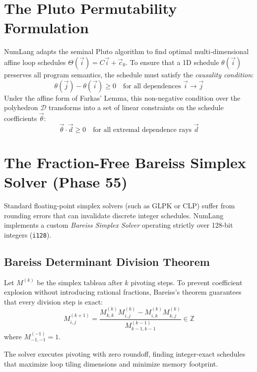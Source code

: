 \section{The Pluto Permutability Formulation}
\label{sec:polyhedral:pluto}

NumLang adapts the seminal Pluto algorithm \citep{bondhugula2008pluto} to find optimal multi-dimensional affine loop schedules $\Theta(\vec{i}) = C \vec{i} + \vec{c}_0$. To ensure that a 1D schedule $\theta(\vec{i})$ preserves all program semantics, the schedule must satisfy the \emph{causality condition}:
\begin{equation}
\theta(\vec{j}) - \theta(\vec{i}) \ge 0 \quad \text{for all dependences } \vec{i} \to \vec{j}
\end{equation}
Under the affine form of Farkas' Lemma, this non-negative condition over the polyhedron $\mathcal{D}$ transforms into a set of linear constraints on the schedule coefficients $\vec{\theta}$:
\begin{equation}
\vec{\theta} \cdot \vec{d} \ge 0 \quad \text{for all extremal dependence rays } \vec{d}
\end{equation}

\section{The Fraction-Free Bareiss Simplex Solver (Phase 55)}
\label{sec:polyhedral:bareiss_solver}

Standard floating-point simplex solvers (such as GLPK or CLP) suffer from rounding errors that can invalidate discrete integer schedules. NumLang implements a custom \emph{Bareiss Simplex Solver} operating strictly over 128-bit integers (\texttt{i128}).

\subsection{Bareiss Determinant Division Theorem}
Let $M^{(k)}$ be the simplex tableau after $k$ pivoting steps. To prevent coefficient explosion without introducing rational fractions, Bareiss's theorem guarantees that every division step is exact:
\begin{equation}
M_{i, j}^{(k+1)} = \frac{M_{k, k}^{(k)} M_{i, j}^{(k)} - M_{i, k}^{(k)} M_{k, j}^{(k)}}{M_{k-1, k-1}^{(k-1)}} \in \mathbb{Z}
\end{equation}
where $M_{-1, -1}^{(-1)} = 1$. 

The solver executes pivoting with zero roundoff, finding integer-exact schedules that maximize loop tiling dimensions and minimize memory footprint.

